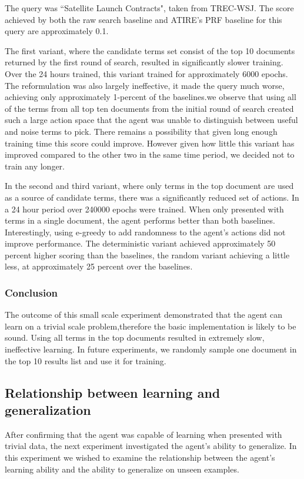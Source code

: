 The query was ``Satellite Launch Contracts", taken from TREC-WSJ. The score achieved by both the raw search baseline and ATIRE's PRF baseline for this query are approximately 0.1.

The first variant, where the candidate terms set consist of the top 10 documents returned by the first round of search, resulted in significantly slower training. Over the 24 hours trained, this variant trained for approximately 6000 epochs. The reformulation was also largely ineffective, it made the query much worse, achieving only approximately 1-percent of the baselines.we observe that using all of the terms from all top ten documents from the initial round of search created such a large action space that the agent was unable to distinguish between useful and noise terms to pick. There remains a possibility that given long enough training time this score could improve. However given how little this variant has improved compared to the other two in the same time period, we decided not to train any longer.

In the second and third variant, where only terms in the top document are used as a source of candidate terms, there was a significantly reduced set of actions.  In a 24 hour period over 240000 epochs were trained.  When only presented with terms in a single document, the agent performs better than both baselines. Interestingly, using e-greedy to add randomness to the agent’s actions did not improve performance. The deterministic variant achieved approximately 50 percent higher scoring than the baselines, the random variant achieving a little less, at approximately 25 percent over the baselines.

\subsubsection{Conclusion}

The outcome of this small scale experiment demonstrated that the agent can learn on a trivial scale problem,therefore the basic implementation is likely to be sound. Using all terms in the top documents resulted in extremely slow, ineffective learning.  In future experiments, we randomly sample one document in the top 10 results list and use it for training. 
\subsection{Relationship between learning and generalization}

After confirming that the agent was capable of learning when presented with trivial data, the next experiment investigated the agent’s ability to generalize. In this experiment we wished to examine the relationship between the agent’s learning ability and the ability to generalize on unseen examples. 

